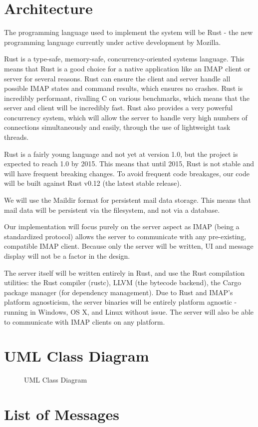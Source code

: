 \documentclass[a4paper,12pt]{article}
\begin{document}
\section*{Architecture}

The programming language used to implement the system will be Rust - the new programming language currently under active development by Mozilla.

Rust is a type-safe, memory-safe, concurrency-oriented systems language.
This means that Rust is a good choice for a native application like an IMAP client or server for several reasons.
Rust can ensure the client and server handle all possible IMAP states and command results, which ensures no crashes.
Rust is incredibly performant, rivalling C on various benchmarks, which means that the server and client will be incredibly fast.
Rust also provides a very powerful concurrency system, which will allow the server to handle very high numbers of connections simultaneously and easily, through the use of lightweight task threads.

Rust is a fairly young language and not yet at version 1.0, but the project is expected to reach 1.0 by 2015.
This means that until 2015, Rust is not stable and will have frequent breaking changes.
To avoid frequent code breakages, our code will be built against Rust v0.12 (the latest stable release).

We will use the Maildir format for persistent mail data storage.
This means that mail data will be persistent via the filesystem, and not via a database.

Our implementation will focus purely on the server aspect as IMAP (being a standardized protocol) allows the server to communicate with any pre-existing, compatible IMAP client.
Because only the server will be written, UI and message display will not be a factor in the design.

The server itself will be written entirely in Rust, and use the Rust compilation utilities: the Rust compiler (rustc), LLVM (the bytecode backend), the Cargo package manager (for dependency management).
Due to Rust and IMAP's platform agnosticism, the server binaries will be entirely platform agnostic - running in Windows, OS X, and Linux without issue.
The server will also be able to communicate with IMAP clients on any platform.

\section*{UML Class Diagram}

\begin{figure}[H]
    \centering
    
    \caption{UML Class Diagram}
\end{figure}

\section*{List of Messages}
\end{document}
